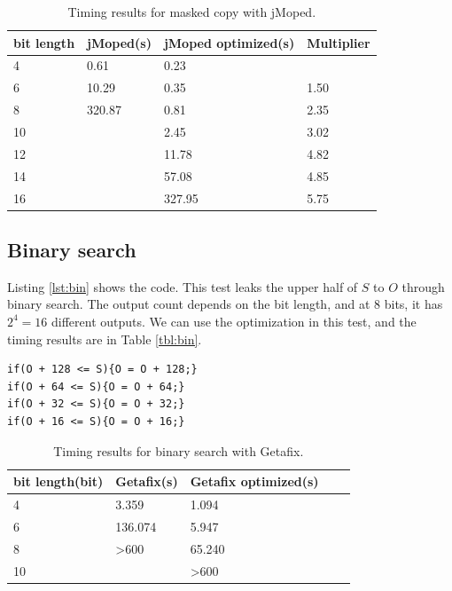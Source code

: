 \begin{table}[!h]
\begin{center}
\begin{tabular}{|l|l|l|l|}
\hline
bit length & jMoped(s) & jMoped optimized(s) & Multiplier \\ \hline
4 & 0.61 & 0.23 &  \\ \hline
6 & 10.29 & 0.35 & 1.50 \\ \hline
8 & 320.87 & 0.81 & 2.35 \\ \hline
10 &  & 2.45 & 3.02 \\ \hline
12 &  & 11.78 & 4.82 \\ \hline
14 &  & 57.08 & 4.85 \\ \hline
16 &  & 327.95 & 5.75 \\ \hline
\end{tabular}
\end{center}
\caption{Timing results for masked copy with jMoped.}
\label{tbl:maskedJ}
\end{table}


\subsection{Binary search}
Listing \ref{lst:bin} shows the code. This test leaks the upper half of $S$ to $O$ through binary search. The output count depends on the bit length, and at $8$ bits, it has $2^{4} = 16$ different outputs. We can use the optimization in this test, and the timing results are in Table \ref{tbl:bin}.

\lstset{language=C}  
\begin{lstlisting}[float=!h, caption={Binary search test program at 8 bits.},label=lst:bin]
if(O + 128 <= S){O = O + 128;}
if(O + 64 <= S){O = O + 64;}
if(O + 32 <= S){O = O + 32;}
if(O + 16 <= S){O = O + 16;}
\end{lstlisting}

\begin{table}[!h]
\centering
\begin{tabular}{|l|l|l|l|l|}
\hline
{bit length(bit)} & Getafix(s) & {Getafix optimized(s)}  \\ \hline
4 & 3.359 & 1.094  \\ \hline
6 & 136.074 & 5.947  \\ \hline
8 & \textgreater 600 & 65.240  \\ \hline
10 &  & \textgreater 600 \\ \hline
\end{tabular}
\caption{Timing results for binary search with Getafix.}
\label{tbl:binG}
\end{table}

